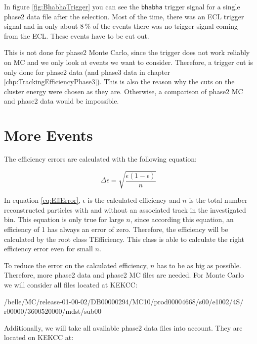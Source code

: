 \documentclass[a4paper,11pt,twosided,final,german,openbib,pdftex,listof=totoc,bibliography=totoc]{scrbook}
\begin{document}
In figure \ref{fig:BhabhaTrigger} you can see the \texttt{bhabha} trigger signal for a single phase2 data file after the selection. Most of the time, there was an ECL trigger signal and in only about $8\,\%$ of the events there was no trigger signal coming from the ECL. These events have to be cut out.

This is not done for phase2 Monte Carlo, since the trigger does not work reliably on MC and we only look at events we want to consider. Therefore, a trigger cut is only done for phase2 data (and phase3 data in chapter \ref{chp:TrackingEfficiencyPhase3}). This is also the reason why the cuts on the cluster energy were chosen as they are. Otherwise, a comparison of phase2 MC and phase2 data would be impossible.

\section{More Events}
\label{sec:Phase2MoreEvents}


The efficiency errors are calculated with the following equation:

\begin{equation}
\Delta \epsilon = \sqrt{\frac{\epsilon(1-\epsilon)}{n}}
\label{eq:EffError}
\end{equation}

In equation \ref{eq:EffError}, $\epsilon$ is the calculated efficiency and $n$ is the total number reconstructed particles with and without an associated track in the investigated bin. This equation is only true for large $n$, since according this equation, an efficiency of 1 has always an error of zero. Therefore, the efficiency will be calculated by the root class TEfficiency. This class is able to calculate the right efficiency error even for small $n$. \cite{TEfficiency}



To reduce the error on the calculated efficiency, $n$ has to be as big as possible. Therefore, more phase2 data and phase2 MC files are needed. For Monte Carlo we will consider all files located at KEKCC: 
\newline

/belle/MC/release-01-00-02/DB00000294/MC10/prod00004668/s00/e1002/4S/
r00000/3600520000/mdst/sub00
\newline

Additionally, we will take all available phase2 data files into account. They are located on KEKCC at:
\newline
\end{document}
